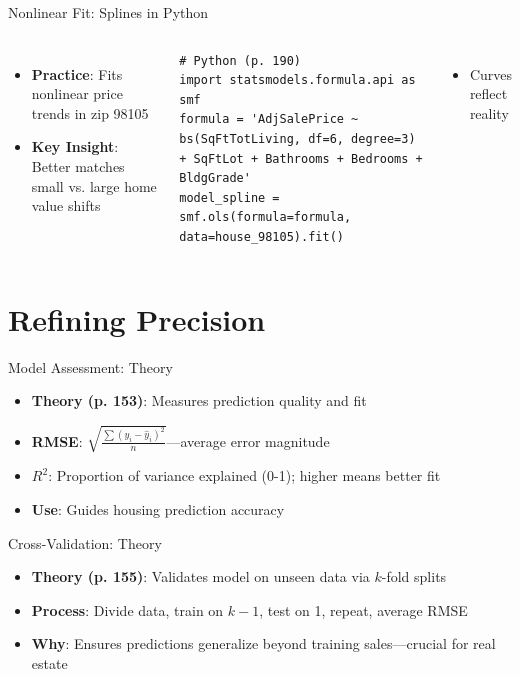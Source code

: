 \documentclass{beamer}
\begin{document}
	\begin{frame}[fragile]{Nonlinear Fit: Splines in Python}
		\lstset{language=Python}
		\begin{columns}
			\begin{itemize}
				\item \textbf{Practice}: Fits nonlinear price trends in zip 98105
				\item \textbf{Key Insight}: Better matches small vs. large home value shifts
			\end{itemize}
			\begin{lstlisting}
# Python (p. 190)
import statsmodels.formula.api as smf
formula = 'AdjSalePrice ~ bs(SqFtTotLiving, df=6, degree=3) + SqFtLot + Bathrooms + Bedrooms + BldgGrade'
model_spline = smf.ols(formula=formula, data=house_98105).fit()
			\end{lstlisting}
			\begin{itemize}
				\item Curves reflect reality
			\end{itemize}
		\end{columns}
	\end{frame}

	
	

	
	\section{Refining Precision}
	
	

	
	\begin{frame}{Model Assessment: Theory}
		\begin{itemize}
			\item \textbf{Theory (p. 153)}: Measures prediction quality and fit
			\item \textbf{RMSE}: $\sqrt{\frac{\sum (y_i - \hat{y}_i)^2}{n}}$—average error magnitude
			\item \textbf{$R^2$}: Proportion of variance explained (0-1); higher means better fit
			\item \textbf{Use}: Guides housing prediction accuracy
		\end{itemize}
	\end{frame}
	
	\begin{frame}{Cross-Validation: Theory}
		\begin{itemize}
			\item \textbf{Theory (p. 155)}: Validates model on unseen data via $k$-fold splits
			\item \textbf{Process}: Divide data, train on $k-1$, test on 1, repeat, average RMSE
			\item \textbf{Why}: Ensures predictions generalize beyond training sales—crucial for real estate
		\end{itemize}
	\end{frame}
\end{document}
